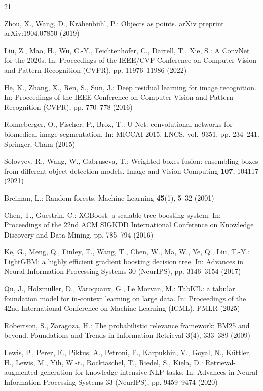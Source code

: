 \documentclass[runningheads]{llncs}
\begin{document}
\begin{thebibliography}{21}

Zhou, X., Wang, D., Kr{\"a}henb{\"u}hl, P.: Objects as points. arXiv preprint arXiv:1904.07850 (2019)

Liu, Z., Mao, H., Wu, C.-Y., Feichtenhofer, C., Darrell, T., Xie, S.: A ConvNet for the 2020s. In: Proceedings of the IEEE/CVF Conference on Computer Vision and Pattern Recognition (CVPR), pp. 11976--11986 (2022)

He, K., Zhang, X., Ren, S., Sun, J.: Deep residual learning for image recognition. In: Proceedings of the IEEE Conference on Computer Vision and Pattern Recognition (CVPR), pp. 770--778 (2016)

Ronneberger, O., Fischer, P., Brox, T.: U-Net: convolutional networks for biomedical image segmentation. In: MICCAI 2015, LNCS, vol.~9351, pp. 234--241. Springer, Cham (2015)

Solovyev, R., Wang, W., Gabruseva, T.: Weighted boxes fusion: ensembling boxes from different object detection models. Image and Vision Computing \textbf{107}, 104117 (2021)

Breiman, L.: Random forests. Machine Learning \textbf{45}(1), 5--32 (2001)

Chen, T., Guestrin, C.: XGBoost: a scalable tree boosting system. In: Proceedings of the 22nd ACM SIGKDD International Conference on Knowledge Discovery and Data Mining, pp. 785--794 (2016)

Ke, G., Meng, Q., Finley, T., Wang, T., Chen, W., Ma, W., Ye, Q., Liu, T.-Y.: LightGBM: a highly efficient gradient boosting decision tree. In: Advances in Neural Information Processing Systems 30 (NeurIPS), pp. 3146--3154 (2017)

Qu, J., Holzm{\"u}ller, D., Varoquaux, G., Le Morvan, M.: TabICL: a tabular foundation model for in-context learning on large data. In: Proceedings of the 42nd International Conference on Machine Learning (ICML). PMLR (2025)

Robertson, S., Zaragoza, H.: The probabilistic relevance framework: BM25 and beyond. Foundations and Trends in Information Retrieval \textbf{3}(4), 333--389 (2009)

Lewis, P., Perez, E., Piktus, A., Petroni, F., Karpukhin, V., Goyal, N., K{\"u}ttler, H., Lewis, M., Yih, W.-t., Rockt{\"a}schel, T., Riedel, S., Kiela, D.: Retrieval-augmented generation for knowledge-intensive NLP tasks. In: Advances in Neural Information Processing Systems 33 (NeurIPS), pp. 9459--9474 (2020)


\end{thebibliography}
\end{document}
